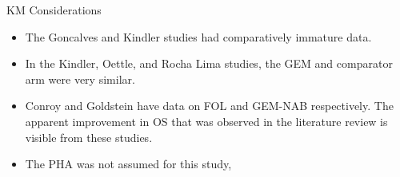 \documentclass{beamer}
\begin{document}
\begin{frame}{KM Considerations}
    \begin{itemize}
        \item The Goncalves and Kindler studies had comparatively immature data. 
        \pause
        \item In the Kindler, Oettle, and Rocha Lima studies, the GEM and comparator arm were very similar. 
        \pause
        \item Conroy and Goldstein have data on FOL and GEM-NAB respectively. The apparent improvement in OS that was observed in the literature review is visible from these studies. 
        \pause
        \item The PHA was not assumed for this study, 
    \end{itemize}
    
\end{frame}
\end{document}
